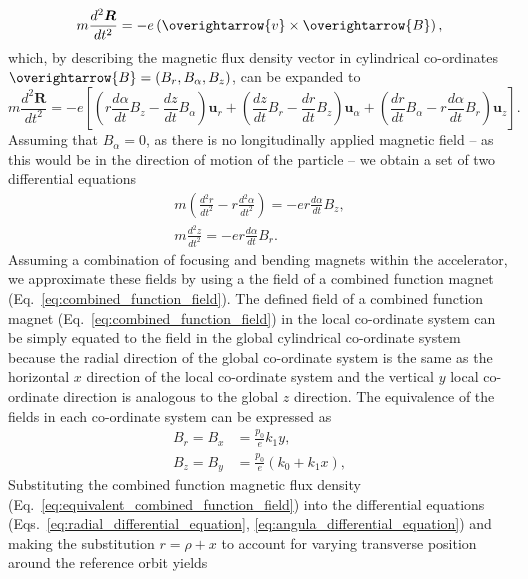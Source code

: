 \documentclass[../main.tex]{subfiles}
\begin{document}
\begin{equation}
m\frac{d^{2}\boldsymbol{R}}{dt^{2}}=-e\left(\overightarrow{v}\times\overightarrow{B}\right),
\label{eq:Lorentz_particle_equating_forces}
\end{equation}
which, by describing the magnetic flux density vector in cylindrical co-ordinates $\overightarrow{B} = \left(B_{r},B_{\alpha},B_{z}\right)$, can be expanded to
\begin{equation}
m\frac{d^{2}\boldsymbol{R}}{dt^{2}} = -e\left[\left(r\frac{d\alpha}{dt}B_{z}-\frac{dz}{dt}B_{\alpha}\right)\boldsymbol{u}_{r}+\left(\frac{dz}{dt}B_{r}-\frac{dr}{dt}B_{z}\right)\boldsymbol{u}_{\alpha}+\left(\frac{dr}{dt}B_{\alpha}-r\frac{d\alpha}{dt}B_{r}\right)\boldsymbol{u}_{z}\right].
\label{eq:Lorentz_particle_equating_forces_expanded}    
\end{equation}
Assuming that $B_{\alpha}=0$, as there is no longitudinally applied magnetic field -- as this would be in the direction of motion of the particle -- we obtain a set of two differential equations
\begin{align}
m\left(\frac{d^{2}r}{dt^{2}}-r\frac{d^{2}\alpha}{dt^{2}}\right)=-er\frac{d\alpha}{dt}B_{z},
\label{eq:radial_differential_equation} \\
m\frac{d^{2}z}{dt^{2}}=-er\frac{d\alpha}{dt}B_{r}.
\label{eq:angular_differential_equation}
\end{align}
Assuming a combination of focusing and bending magnets within the accelerator, we approximate these fields by using a the field of a combined function magnet (Eq.~\ref{eq:combined_function_field}). The defined field of a combined function magnet (Eq.~\ref{eq:combined_function_field}) in the local co-ordinate system can be simply equated to the field in the global cylindrical co-ordinate system  because the radial direction of the global co-ordinate system is the same as the horizontal $x$ direction of the local co-ordinate system and the vertical $y$ local co-ordinate direction is analogous to the global $z$ direction. The equivalence of the fields in each co-ordinate system can be expressed as
\begin{align}
B_{r} = B_{x} &= \frac{p_{0}}{e}k_{1}y, \\
B_{z} = B_{y} &= \frac{p_{0}}{e}\left(k_{0}+k_{1}x\right),
\label{eq:equivalent_combined_function_field}
\end{align}
Substituting the combined function magnetic flux density (Eq.~\ref{eq:equivalent_combined_function_field}) into the differential equations (Eqs.~\ref{eq:radial_differential_equation}, \ref{eq:angula_differential_equation}) and making the substitution $r=\rho+x$ to account for varying transverse position around the reference orbit yields
\end{document}
